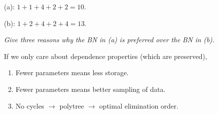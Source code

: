 \documentclass{article}
\begin{document}
\begin{enumerate}[(a)]
  (a): $1+1+4+2+2=10$.

  (b): $1+2+4+2+4=13$.

  \textit{Give three reasons why the BN in (a) is preferred over the
    BN in (b).}

  If we only care about dependence properties (which are preserved),
  \begin{enumerate}
  \item Fewer parameters means less storage.
  \item Fewer parameters means better sampling of data.
  \item No cycles $\rightarrow$ polytree $\rightarrow$ optimal
    elimination order.
  \end{enumerate}

\end{enumerate}
\end{document}
